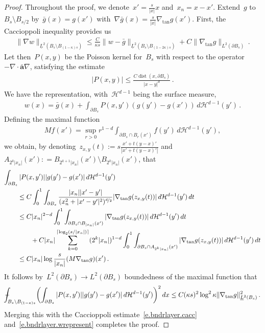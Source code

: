 \documentclass[11pt,twoside]{article} %
\numberwithin{equation}{section}
\theoremstyle{definition}
\renewcommand{\a}{\mathbf{a}}
\newcommand{\ahom}{\bar{\a}}
\DeclareMathOperator{\dist}{dist}
\def\Xint#1{\mathchoice
{\XXint\displaystyle\textstyle{#1}}%
{\XXint\textstyle\scriptstyle{#1}}%
{\XXint\scriptstyle\scriptscriptstyle{#1}}%
{\XXint\scriptscriptstyle\scriptscriptstyle{#1}}%
\!\int}
\def\XXint#1#2#3{{\setbox0=\hbox{$#1{#2#3}{\int}$}
\vcenter{\hbox{$#2#3$}}\kern-.5\wd0}}
\def\fint{\Xint-}
\begin{document}
\begin{proof}
Throughout the proof, we denote~$x' = \frac{s}{|x|} x$ and~$x_n = x-x'$. Extend~$g$ to~$B_s\setminus B_{s/2}$ by~$\bar g(x) = g(x')$ with~$\nabla \bar g(x) = \frac{s}{|x|} \nabla_{\mathrm{tan}} g(x')$.  First, the Caccioppoli inequality provides us
\begin{align}  \label{e.bndrlayer.cacc}
\| \nabla w \|_{\underline{L}^2(B_{s} \setminus B_{(1-\kappa)s})}  
\leq
\frac{C}{\kappa s} \| w - \bar g \|_{\underline{L}^2(B_{s} \setminus B_{(1-2\kappa)s})}
+
C \| \nabla_{\mathrm{tan}} g \|_{L^2(\partial B_{s})}
\,.
\end{align}
Let then~$P(x,y)$ be the Poisson kernel for~$B_s$ with respect to the operator~$-\nabla \cdot \ahom \nabla$, satisfying the estimate
\begin{align*}  
|P(x,y)| \leq \frac{C\dist(x,\partial B_s)}{|x-y|^d}\,.
\end{align*}
We have the representation, with~$\mathcal{H}^{d-1}$ being the surface measure, 
\begin{align}  \label{e.bndrlayer.wrepresent}
w(x) = \bar g(x)  
+
 \int_{\partial B_s} P(x,y') (g(y') -  g(x')) \, d\mathcal{H}^{d-1}(y') 
 \,.
\end{align}
Defining the maximal function
\begin{align*}  
M f(x') = \sup_{r>0} r^{1-d} \int_{\partial B_s \cap B_r(x')} f(y') \, d\mathcal{H}^{d-1}(y') ,
\end{align*}
we obtain, by denoting~$z_{x,y}(t) := s \frac{x' + t(y-x)'}{|x' + t(y-x)'|}$ and~$A_{2^k|x_n|}(x') : = B_{2^{k+1} |x_n|}(x')\setminus B_{2^{k} |x_n|}(x')$, that
\begin{align}  
\lefteqn{
\int_{\partial B_s} |P(x,y')| |g(y') -  g(x')| \, d\mathcal{H}^{d-1}(y') 
} \qquad &
\notag \\ 
&
\leq 
C \int_{0}^1 \int_{\partial B_s } 
\frac{|x_n| |x' - y'| }{(x_n^2 + |x' - y'|^2)^{\nicefrac d2}} |\nabla_{\mathrm{tan}} g(z_{x,y}(t))| \, d\mathcal{H}^{d-1}(y') \, dt
\notag \\ 
& 
\leq
C |x_n|^{2-d}
\int_{0}^1 \int_{\partial B_s \cap B_{|x_n|}(x') }  |\nabla_{\mathrm{tan}} g(z_{x,y}(t))| \, d\mathcal{H}^{d-1}(y')  \, dt
\notag \\ 
&  \qquad
+
C |x_n| \sum_{k=0}^{ \lceil \log_2 (s/|x_n|) \rceil}
(2^{k} |x_n|)^{1-d}  
\int_{0}^1 \int_{\partial B_s  \cap A_{2^k|x_n|}(x')}  
 |\nabla_{\mathrm{tan}} g(z_{x,y}(t))| \, d\mathcal{H}^{d-1}(y') \, dt
 \notag \\ 
& 
\leq
C |x_n| \log \frac{s}{|x_n|} (M \nabla_{\mathrm{tan}} g)(x')
\,.
 \notag
\end{align}
It follows by~$L^2(\partial B_s) \to L^2(\partial B_s)$ boundedness of the maximal function that 
\begin{align*}  
\fint_{B_s \setminus B_{(1-\kappa)s}}  
\biggl( 
\int_{\partial B_s} |P(x,y')| |g(y') -  g(x')| \, d\mathcal{H}^{d-1}(y') 
\biggr)^2 \, dx 
\leq 
C (\kappa s)^2 \log^2 \kappa  \| \nabla_{\mathrm{tan}} g \|_{\underline{L}^2(B_s)}^2
\,.
\end{align*}
Merging this with the Caccioppoli estimate~\eqref{e.bndrlayer.cacc} and~\eqref{e.bndrlayer.wrepresent} completes the proof.  
\end{proof}
\end{document}
